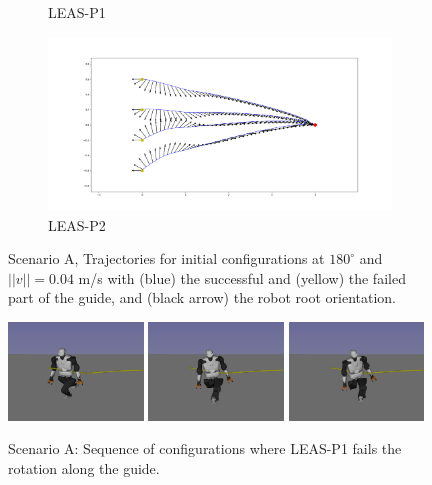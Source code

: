 \begin{figure}[ht]
\begin{subfigure}[t]{0.49\linewidth}
    \caption{LEAS-P1}
    \label{fig:cp-sb:rotation_scenario:leas_p1}
    \end{subfigure}
    \begin{subfigure}[t]{0.49\linewidth}
    \includegraphics[width=\textwidth]{Figures/Chapter_CPSB/rotation_p2_180_v04.png}
    \caption{LEAS-P2}
    \label{fig:cp-sb:rotation_scenario:leas_p2}
    \end{subfigure}
    \caption{Scenario A, Trajectories for initial configurations at $180^{\circ}$ and $||v||=0.04$ m/s with (blue) the successful and (yellow) the failed part of the guide, and (black arrow) the robot root orientation.}
    \label{fig:cp-sb:rotation_scenario}
\end{figure}
\begin{figure}[ht]
    \captionsetup[subfigure]{justification=centering}
    \centering
    \includegraphics[trim={2cm 2cm 4cm 2cm}, clip,width=0.32\textwidth]{Figures/Chapter_CPSB/rotation_seq/rot2.png}
    \includegraphics[trim={2cm 2cm 4cm 2cm}, clip,width=0.32\textwidth]{Figures/Chapter_CPSB/rotation_seq/rot3.png}
    \includegraphics[trim={2cm 2cm 4cm 2cm}, clip,width=0.32\textwidth]{Figures/Chapter_CPSB/rotation_seq/rot4.png}
    \caption{Scenario A: Sequence of configurations where LEAS-P1 fails the rotation along the guide.}
    \label{fig:cp-sb:rotation_leas_p1_fail}
\end{figure}

